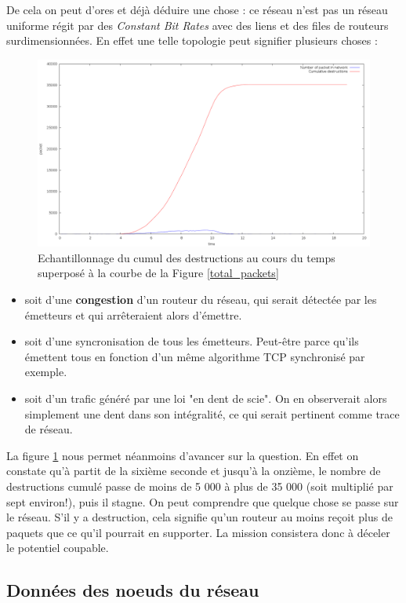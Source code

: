 \documentclass[
10pt, %
a4paper, %
oneside, %
headinclude,footinclude, %
BCOR5mm, %
]{scrartcl}
\begin{document}
De cela on peut d'ores et déjà déduire une chose : ce réseau n'est pas un réseau uniforme régit par des \textit{Constant Bit Rates} avec des liens et des files de routeurs surdimensionnées. En effet une telle topologie peut signifier plusieurs choses : 
\begin{figure}
	\centerfloat
    \includegraphics[width=19cm]{png/destr_cumul.png}
	\caption{Echantillonnage du cumul des destructions au cours du temps superposé à la courbe de la Figure \ref{total_packets}}
   \label{total_destroys}
\end{figure}
\begin{itemize}
\item{soit d'une \textbf{congestion} d'un routeur du réseau, qui serait détectée par les émetteurs et qui arrêteraient alors d'émettre.}
\item{soit d'une syncronisation de tous les émetteurs. Peut-être parce qu'ils émettent tous en fonction d'un même algorithme TCP synchronisé par exemple.}
\item{soit d'un trafic généré par une loi "en dent de scie". On en observerait alors simplement une dent dans son intégralité, ce qui serait pertinent comme trace de réseau.}
\end{itemize}

La figure \ref{total_destroys} nous permet néanmoins d'avancer sur la question. En effet on constate qu'à partit de la sixième seconde et jusqu'à la onzième, le nombre de destructions cumulé passe de moins de 5 000 à plus de 35 000 (soit multiplié par sept environ!), puis il stagne.
On peut comprendre que quelque chose se passe sur le réseau. S'il y a destruction, cela signifie qu'un routeur au moins reçoit plus de paquets que ce qu'il pourrait en supporter. La mission consistera donc à déceler le potentiel coupable.
\newpage
\subsection{Données des noeuds du réseau}
\end{document}
